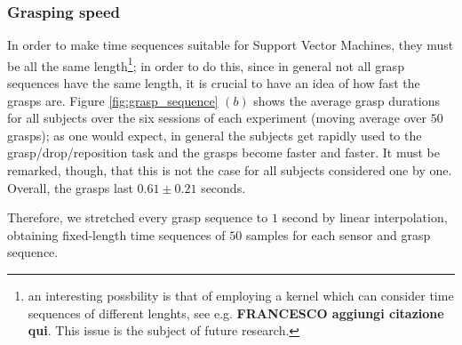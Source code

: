 \subsubsection*{Grasping speed}

In order to make time sequences suitable for Support Vector Machines,
they must be all the same length\footnote{an interesting possbility is
that of employing a kernel which can consider time sequences of
different lenghts, see e.g. \cite{...} {\bf FRANCESCO aggiungi
citazione qui}. This issue is the subject of future research.}; in
order to do this, since in general not all grasp sequences have the
same length, it is crucial to have an idea of how fast the grasps are.
Figure \ref{fig:grasp_sequence} $(b)$ shows the average grasp
durations for all subjects over the six sessions of each experiment
(moving average over $50$ grasps); as one would expect, in general the
subjects get rapidly used to the grasp/drop/reposition task and the
grasps become faster and faster. It must be remarked, though, that
this is not the case for all subjects considered one by one. Overall,
the grasps last $0.61 \pm 0.21$ seconds.

Therefore, we stretched every grasp sequence to $1$ second by linear
interpolation, obtaining fixed-length time sequences of $50$ samples
for each sensor and grasp sequence.
